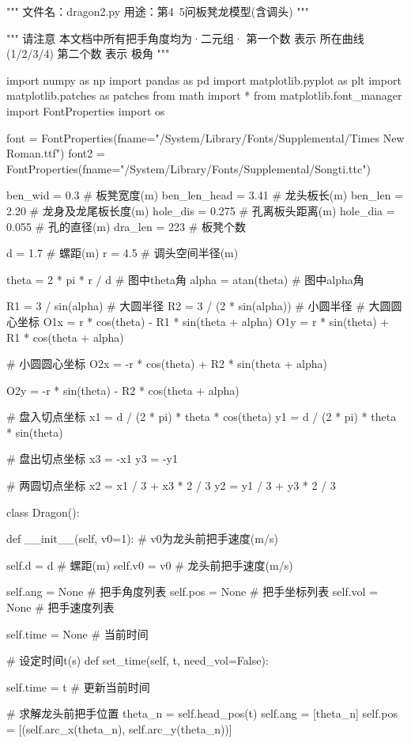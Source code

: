 \documentclass[withoutpreface,bwprint]{cumcmthesis}
\begin{document}
\begin{CodeText}
"""
文件名：dragon2.py
用途：第4~5问板凳龙模型(含调头)
"""

"""
请注意
本文档中所有把手角度均为·二元组·
第一个数 表示 所在曲线(1/2/3/4)
第二个数 表示 极角
"""

import numpy as np
import pandas as pd
import matplotlib.pyplot as plt
import matplotlib.patches as patches
from math import *
from matplotlib.font_manager import FontProperties
import os

font = FontProperties(fname="/System/Library/Fonts/Supplemental/Times New Roman.ttf")
font2 = FontProperties(fname="/System/Library/Fonts/Supplemental/Songti.ttc")

ben_wid = 0.3 # 板凳宽度(m)
ben_len_head = 3.41 # 龙头板长(m)
ben_len = 2.20 # 龙身及龙尾板长度(m)
hole_dis = 0.275 # 孔离板头距离(m)
hole_dia = 0.055 # 孔的直径(m)
dra_len = 223 # 板凳个数

d = 1.7 # 螺距(m)
r = 4.5 # 调头空间半径(m)

theta = 2 * pi * r / d # 图中theta角
alpha = atan(theta) # 图中alpha角

R1 = 3 / sin(alpha) # 大圆半径
R2 = 3 / (2 * sin(alpha)) # 小圆半径
# 大圆圆心坐标
O1x = r * cos(theta) - R1 * sin(theta + alpha)
O1y = r * sin(theta) + R1 * cos(theta + alpha)

# 小圆圆心坐标
O2x = -r * cos(theta) + R2 * sin(theta + alpha)

O2y = -r * sin(theta) - R2 * cos(theta + alpha)

# 盘入切点坐标
x1 = d / (2 * pi) * theta * cos(theta)
y1 = d / (2 * pi) * theta * sin(theta)

# 盘出切点坐标
x3 = -x1
y3 = -y1

# 两圆切点坐标
x2 = x1 / 3 + x3 * 2 / 3
y2 = y1 / 3 + y3 * 2 / 3


class Dragon():

   def __init__(self, v0=1): # v0为龙头前把手速度(m/s)

      self.d = d # 螺距(m)
      self.v0 = v0 # 龙头前把手速度(m/s)

      self.ang = None # 把手角度列表
      self.pos = None # 把手坐标列表
      self.vol = None # 把手速度列表

      self.time = None # 当前时间

   # 设定时间t(s)
   def set_time(self, t, need_vol=False):

      self.time = t # 更新当前时间

      # 求解龙头前把手位置
      theta_n = self.head_pos(t)
      self.ang = [theta_n]
      self.pos = [(self.arc_x(theta_n), self.arc_y(theta_n))]


\end{CodeText}
\end{document}

